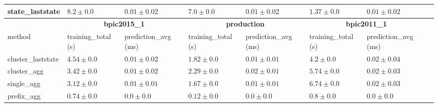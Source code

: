 \documentclass[twoside,11pt]{Latex/Classes/PhDthesisPSnPDF}
\begin{document}
\begin{table}[!htbp]
{\begin{tabular}{llllllll}
			state\_laststate & $8.2 \pm 0.0$ & $0.01 \pm 0.02$ & $7.0 \pm 0.0$ & $0.01 \pm 0.02$ & $1.37 \pm 0.0$ & $0.01 \pm 0.02$ \\ 
			\bottomrule
			\toprule
			& \multicolumn{2}{c}{{\bfseries bpic2015\_1}} & \multicolumn{2}{c}{{\bfseries production}} & \multicolumn{2}{c}{{\bfseries bpic2011\_1}} \\ \cmidrule(lr){2-3} \cmidrule(lr){4-5} \cmidrule(lr){6-7}
			method  & training\_total (s) & prediction\_avg (ms) & training\_total (s) & prediction\_avg (ms) & training\_total (s) & prediction\_avg (ms) \\ \midrule
			cluster\_laststate & $4.54 \pm 0.0$ & $0.01 \pm 0.02$ & $1.82 \pm 0.0$ & $0.01 \pm 0.01$ & $4.2 \pm 0.0$ & $0.02 \pm 0.04$ \\ 
			cluster\_agg & $3.42 \pm 0.0$ & $0.01 \pm 0.02$ & $2.29 \pm 0.0$ & $0.02 \pm 0.01$ & $5.74 \pm 0.0$ & $0.02 \pm 0.03$ \\ 
			single\_agg & $3.12 \pm 0.0$ & $0.01 \pm 0.01$ & $1.67 \pm 0.0$ & $0.01 \pm 0.01$ & $6.74 \pm 0.0$ & $0.02 \pm 0.03$ \\ 
			prefix\_agg & $0.74 \pm 0.0$ & $\mathbf{0.0 \pm 0.0}$ & $0.12 \pm 0.0$ & $\mathbf{0.0 \pm 0.0}$ & $0.8 \pm 0.0$ & $\mathbf{0.0 \pm 0.0}$ \\ 
			

\end{tabular}}
\end{table}
\end{document}
